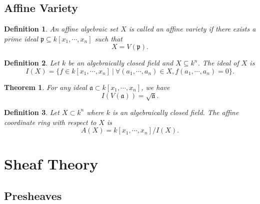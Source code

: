 \documentclass{article}
\newtheorem{theorem}{Theorem}[section]
\newtheorem{definition}{Definition}[section]
\numberwithin{equation}{section}
\begin{document}
\subsection{Affine Variety}

\begin{definition}
An affine algebraic set $X$ is called an affine variety if there exists a prime ideal $\mathfrak{p}\subseteq k[x_1,\cdots,x_n]$ such that
\begin{equation*}
X=V(\mathfrak{p}).
\end{equation*}
\end{definition}

\begin{definition}
Let $k$ be an algebraically closed field and $X\subseteq k^n$. The ideal of $X$ is 
\begin{equation*}
I(X)=\{f\in k[x_1,\cdots,x_n]\:|\: \forall (a_1,\cdots,a_n)\in X, f(a_1,\cdots,a_n) = 0\}.
\end{equation*}
\end{definition}

\begin{theorem}
For any ideal $\mathfrak{a}\subset k[x_1,\cdots,x_n]$, we have
\begin{equation*}
I(V(\mathfrak{a})) = \sqrt{\mathfrak{a}}.
\end{equation*}
\end{theorem}

\begin{definition}
Let $X\subset k^n$ where $k$ is an algebraically closed field. The affine coordinate ring with respect to $X$ is 
\begin{equation*}
A(X)=k[x_1,\cdots,x_n]/I(X).
\end{equation*}
\end{definition}

\section{Sheaf Theory}

\subsection{Presheaves}
\end{document}

